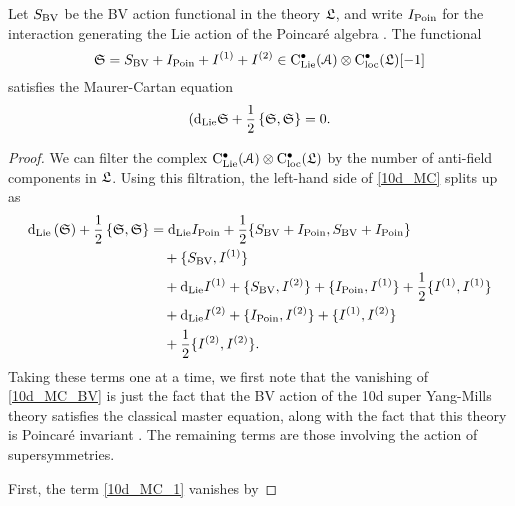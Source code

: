 \documentclass[10pt, oneside]{article}
\begin{document}
\begin{prop}
Let $S_{\mathrm{BV}}$ be the BV action functional in the theory $\mathfrak L$, and write $I_{\mathrm{Poin}}$ for the interaction generating the Lie action of the Poincar\'e algebra . The functional
\[\mathfrak S = S_{\mathrm{BV}} + I_{\mathrm{Poin}} + I^{(1)} + I^{(2)} \in {\rm C}_{\rm Lie}^\bullet(\mathcal{A}) \otimes {\rm C}_{\rm loc}^\bullet(\mathfrak L) [-1]\]
satisfies the Maurer-Cartan equation
\begin{equation} 
\label{10d_MC}
({\rm d}_{\rm Lie} \mathfrak S + \frac{1}{2} \left\{\mathfrak S , \mathfrak S \right\} = 0 .
\end{equation}
\end{prop}

\begin{proof}
We can filter the complex ${\rm C}_{\rm Lie}^\bullet(\mathcal{A}) \otimes {\rm C}_{\rm loc}^\bullet(\mathfrak L)$ by the number of anti-field components in $\mathfrak L$.  Using this filtration, the left-hand side of \ref{10d_MC} splits up as
\begin{align}
{\rm d}_{\rm Lie}  \left( \mathfrak S \right) + \frac{1}{2} \left\{ \mathfrak S , \mathfrak S \right\} &= {\rm d}_{\mathrm{Lie}} I_{\mathrm{Poin}} + \frac 12 \{S_{\mathrm{BV}} + I_{\mathrm{Poin}}, S_{\mathrm{BV}} + I_{\mathrm{Poin}}\} \label{10d_MC_BV}\\
&\quad + \{S_{\mathrm{BV}}, I^{(1)}\} \label{10d_MC_1}\\
&\quad + {\rm d}_{\mathrm{Lie}} I^{(1)} + \{S_{\mathrm{BV}}, I^{(2)}\} + \{I_{\mathrm{Poin}}, I^{(1)}\} + \frac 12 \{I^{(1)}, I^{(1)}\} \label{10d_MC_2}\\
&\quad + {\rm d}_{\mathrm{Lie}} I^{(2)} + \{I_{\mathrm{Poin}}, I^{(2)}\} + \{I^{(1)}, I^{(2)}\} \label{10d_MC_3}\\
&\quad + \frac 12 \{I^{(2)}, I^{(2)}\}. \label{10d_MC_4}
\end{align}
Taking these terms one at a time, we first note that the vanishing of \ref{10d_MC_BV} is just the fact that the BV action of the 10d super Yang-Mills theory satisfies the classical master equation, along with the fact that this theory is Poincar\'e invariant .  The remaining terms are those involving the action of supersymmetries.

First, the term \ref{10d_MC_1} vanishes by 
\end{proof}
\end{document}
